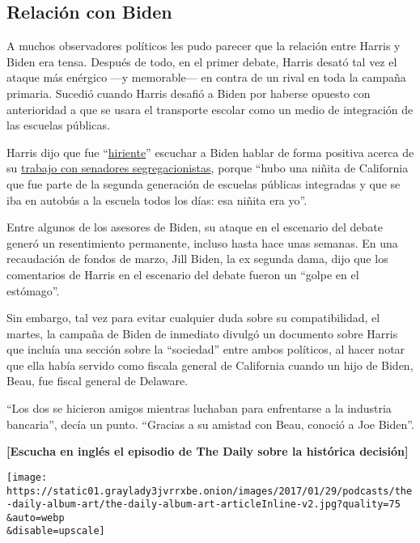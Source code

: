 \hypertarget{relaciuxf3n-con-biden}{%
\subsection{Relación con Biden}\label{relaciuxf3n-con-biden}}

A muchos observadores políticos les pudo parecer que la relación entre
Harris y Biden era tensa. Después de todo, en el primer debate, Harris
desató tal vez el ataque más enérgico ---y memorable--- en contra de un
rival en toda la campaña primaria. Sucedió cuando Harris desafió a Biden
por haberse opuesto con anterioridad a que se usara el transporte
escolar como un medio de integración de las escuelas públicas.

Harris dijo que fue
``\href{https://www.nytimes3xbfgragh.onion/2019/06/19/us/politics/biden-segregationists.html}{hiriente}''
escuchar a Biden hablar de forma positiva acerca de su
\href{https://www.nytimes3xbfgragh.onion/2019/06/19/us/politics/biden-segregationists.html}{trabajo
con senadores segregacionistas}, porque ``hubo una niñita de California
que fue parte de la segunda generación de escuelas públicas integradas y
que se iba en autobús a la escuela todos los días: esa niñita era yo''.

Entre algunos de los asesores de Biden, su ataque en el escenario del
debate generó un resentimiento permanente, incluso hasta hace unas
semanas. En una recaudación de fondos de marzo, Jill Biden, la ex
segunda dama, dijo que los comentarios de Harris en el escenario del
debate fueron un ``golpe en el estómago''.

Sin embargo, tal vez para evitar cualquier duda sobre su compatibilidad,
el martes, la campaña de Biden de inmediato divulgó un documento sobre
Harris que incluía una sección sobre la ``sociedad'' entre ambos
políticos, al hacer notar que ella había servido como fiscala general de
California cuando un hijo de Biden, Beau, fue fiscal general de
Delaware.

``Los dos se hicieron amigos mientras luchaban para enfrentarse a la
industria bancaria'', decía un punto. ``Gracias a su amistad con Beau,
conoció a Joe Biden''.

\textbf{{[}Escucha en inglés el episodio de The Daily sobre la histórica
decisión{]}}

\texttt{[image: https://static01.graylady3jvrrxbe.onion/images/2017/01/29/podcasts/the-daily-album-art/the-daily-album-art-articleInline-v2.jpg?quality=75\\\&auto=webp\\\&disable=upscale]}

